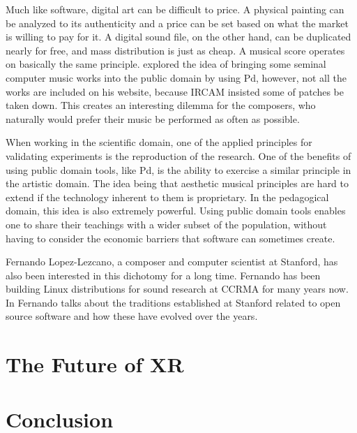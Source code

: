 Much like software, digital art can be difficult to price. A physical painting can be analyzed to its authenticity and a price can be set based on what the market is willing to pay for it. A digital sound file, on the other hand, can be duplicated nearly for free, and mass distribution is just as cheap. A musical score operates on basically the same principle. \cite{puckette2001new} explored the idea of bringing some seminal computer music works into the public domain by using Pd, however, not all the works are included on his website, because IRCAM insisted some of patches be taken down. This creates an interesting dilemma for the composers, who naturally would prefer their music be performed as often as possible. 

When working in the scientific domain, one of the applied principles for validating experiments is the reproduction of the research. One of the benefits of using public domain tools, like Pd, is the ability to exercise a similar principle in the artistic domain. The idea being that aesthetic musical principles are hard to extend if the technology inherent to them is proprietary. In the pedagogical domain, this idea is also extremely powerful. Using public domain tools enables one to share their teachings with a wider subset of the population, without having to consider the economic barriers that software can sometimes create. 

Fernando Lopez-Lezcano, a composer and computer scientist at Stanford, has also been interested in this dichotomy for a long time. Fernando has been building Linux distributions for sound research at CCRMA for many years now. In \cite{CEC-eCon28-online} Fernando talks about the traditions established at Stanford related to open source software and how these have evolved over the years. 


\section{The Future of XR}
\section{Conclusion}




